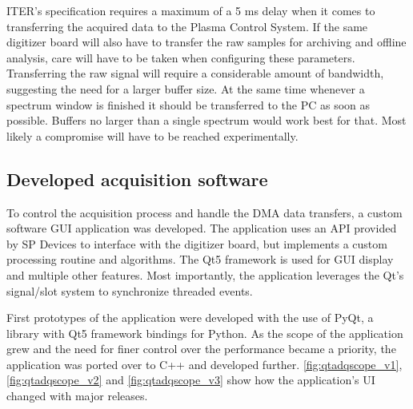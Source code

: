 ITER's specification requires a maximum of a 5 ms delay when it comes
to transferring the acquired data to the Plasma Control System.
If the same digitizer board will also have to transfer the raw
samples for archiving and offline analysis, care will have to 
be taken when configuring these parameters. Transferring the raw signal
will require a considerable amount of bandwidth, suggesting the need for a larger
buffer size. At the same time whenever a spectrum window is finished
it should be transferred to the PC as soon as possible.
Buffers no larger than a single spectrum would work best for that.
Most likely a compromise will have to be reached experimentally.

\subsection{Developed acquisition software}

To control the acquisition process and handle the DMA data transfers,
a custom software GUI application was developed. The application
uses an API provided by SP Devices to interface with the digitizer board,
but implements a custom processing routine and algorithms.
The Qt5 framework is used for GUI display and multiple other features.
Most importantly, the application leverages the Qt's signal/slot system 
to synchronize threaded events.


First prototypes of the application were developed with the use of PyQt, 
a library with Qt5 framework bindings for Python.
As the scope of the application grew
and the need for finer control over the performance became a priority,
the application was ported over to C++ and developed further.
\autoref{fig:qtadqscope_v1}, \autoref{fig:qtadqscope_v2} and
\autoref{fig:qtadqscope_v3} show how the application's UI 
changed with major releases.

